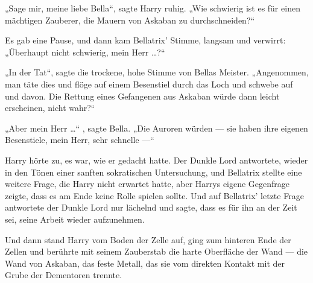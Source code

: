 „Sage mir, meine liebe Bella“, sagte Harry ruhig.
„Wie schwierig ist es für einen mächtigen Zauberer, die Mauern von Askaban zu durchschneiden?“

Es gab eine Pause, und dann kam Bellatrix’ Stimme, langsam und verwirrt: „Überhaupt nicht schwierig, mein Herr …?“

„In der Tat“, sagte die trockene, hohe Stimme von Bellas Meister.
„Angenommen, man täte dies und flöge auf einem Besenstiel durch das Loch und schwebe auf und davon. Die Rettung eines Gefangenen aus Askaban würde dann leicht erscheinen, nicht wahr?“

„Aber mein Herr …“ , sagte Bella.
„Die Auroren würden — sie haben ihre eigenen Besenstiele, mein Herr, sehr schnelle —“

Harry hörte zu, es war, wie er gedacht hatte. Der Dunkle Lord antwortete, wieder in den Tönen einer sanften sokratischen Untersuchung, und Bellatrix stellte eine weitere Frage, die Harry nicht erwartet hatte, aber Harrys eigene Gegenfrage zeigte, dass es am Ende keine Rolle spielen sollte. Und auf Bellatrix’ letzte Frage antwortete der Dunkle Lord nur lächelnd und sagte, dass es für ihn an der Zeit sei, seine Arbeit wieder aufzunehmen.

Und dann stand Harry vom Boden der Zelle auf, ging zum hinteren Ende der Zellen und berührte mit seinem Zauberstab die harte Oberfläche der Wand — die Wand von Askaban, das feste Metall, das sie vom direkten Kontakt mit der Grube der Dementoren trennte.

